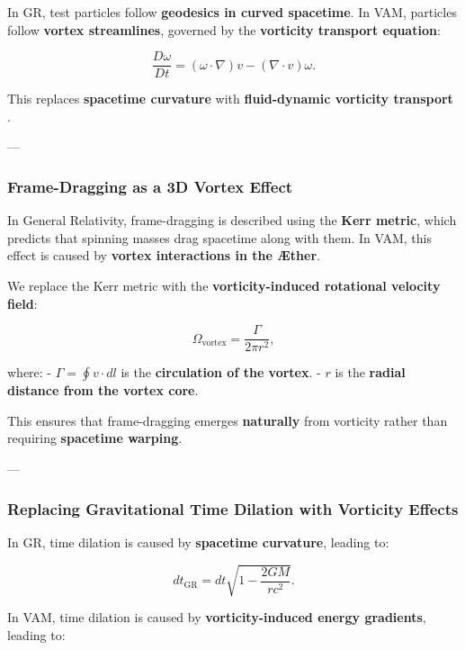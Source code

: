 In GR, test particles follow \textbf{geodesics in curved spacetime}. In VAM, particles follow \textbf{vortex streamlines}, governed by the \textbf{vorticity transport equation}:

\begin{equation*}
    \frac{D\omega}{Dt} = (\omega \cdot \nabla) v - (\nabla \cdot v) \omega.
\end{equation*}

This replaces \textbf{spacetime curvature} with \textbf{fluid-dynamic vorticity transport} \cite{lamb_hydrodynamics, feynman_superfluid}.

---

\subsubsection*{Frame-Dragging as a 3D Vortex Effect}

In General Relativity, frame-dragging is described using the \textbf{Kerr metric}, which predicts that spinning masses drag spacetime along with them. In VAM, this effect is caused by \textbf{vortex interactions in the Æther}.

We replace the Kerr metric with the \textbf{vorticity-induced rotational velocity field}:

\begin{equation*}
    \Omega_\text{vortex} = \frac{\Gamma}{2\pi r^2},
\end{equation*}

where:
- \( \Gamma = \oint v \cdot dl \) is the \textbf{circulation of the vortex}.
- \( r \) is the \textbf{radial distance from the vortex core}.

This ensures that frame-dragging emerges \textbf{naturally} from vorticity rather than requiring \textbf{spacetime warping}.

---

\subsubsection*{Replacing Gravitational Time Dilation with Vorticity Effects}

In GR, time dilation is caused by \textbf{spacetime curvature}, leading to:

\begin{equation*}
    dt_\text{GR} = dt \sqrt{1 - \frac{2GM}{rc^2}}.
\end{equation*}

In VAM, time dilation is caused by \textbf{vorticity-induced energy gradients}, leading to:

